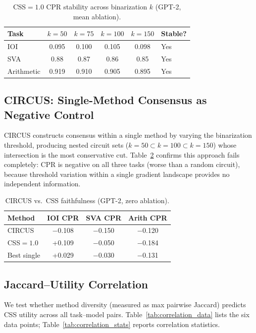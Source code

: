 \documentclass[11pt]{article}
\begin{document}
\begin{table}[h]
\centering
\caption{CSS$=1.0$ CPR stability across binarization $k$ (GPT-2, mean ablation).}
\label{tab:ksweep}
\begin{tabular}{lccccl}
\toprule
Task & $k=50$ & $k=75$ & $k=100$ & $k=150$ & Stable? \\
\midrule
IOI & 0.095 & 0.100 & 0.105 & 0.098 & Yes \\
SVA & 0.88 & 0.87 & 0.86 & 0.85 & Yes \\
Arithmetic & 0.919 & 0.910 & 0.905 & 0.895 & Yes \\
\bottomrule
\end{tabular}
\end{table}

\subsection{CIRCUS: Single-Method Consensus as Negative Control}
\label{sec:circus}

CIRCUS \citep{parekh2026circus} constructs consensus within a single method by varying the binarization threshold, producing nested circuit sets ($k=50 \subset k=100 \subset k=150$) whose intersection is the most conservative cut. Table~\ref{tab:circus} confirms this approach fails completely: CPR is negative on all three tasks (worse than a random circuit), because threshold variation within a single gradient landscape provides no independent information.

\begin{table}[h]
\centering
\caption{CIRCUS vs.\ CSS faithfulness (GPT-2, zero ablation).}
\label{tab:circus}
\begin{tabular}{lccc}
\toprule
Method & IOI CPR & SVA CPR & Arith CPR \\
\midrule
CIRCUS & $-$0.108 & $-$0.150 & $-$0.120 \\
CSS$=1.0$ & +0.109 & $-$0.050 & $-$0.184 \\
Best single & +0.029 & $-$0.030 & $-$0.131 \\
\bottomrule
\end{tabular}
\end{table}

\subsection{Jaccard--Utility Correlation}
\label{sec:correlation}

We test whether method diversity (measured as max pairwise Jaccard) predicts CSS utility across all task--model pairs. Table~\ref{tab:correlation_data} lists the six data points; Table~\ref{tab:correlation_stats} reports correlation statistics.
\end{document}
